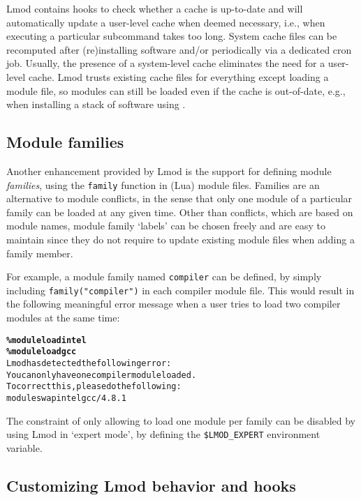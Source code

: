 Lmod contains hooks to check whether a cache is up-to-date and will automatically
update a user-level cache when deemed necessary, i.e., when executing a particular
subcommand takes too long. System cache files can be recomputed after (re)installing software and/or periodically via a dedicated cron job. Usually, the presence of a
system-level cache eliminates the need for a user-level cache.
Lmod trusts existing cache files for everything except loading a module
file, so modules can still be loaded even if the cache is out-of-date, e.g., when
installing a stack of software using \easybuild{}.


\subsection{Module families}

Another enhancement provided by Lmod is the support for defining module
\emph{families}, using the \texttt{\small family} function in (Lua) module files.
Families are an alternative to module conflicts, in the sense that only one module of
a particular family can be loaded at any given time. Other than conflicts, which
are based on module names, module family `labels' can be chosen freely and are easy
to maintain since they do not require to update existing module files when adding a
family member.

For example, a module family named \texttt{\small compiler} can be defined, by
simply including \texttt{\small family("compiler")} in each compiler module file.
This would result in the following meaningful error message when a user tries to
load two compiler modules at the same time:

{\small
\begin{alltt}
  \textbf{\% module load intel}
  \textbf{\% module load gcc}
  Lmod has detected the following error:
  You can only have one compiler module loaded.
  To correct this, please do the following:
      module swap intel gcc/4.8.1\
\end{alltt}}
\noindent
The constraint of only allowing to load one module per family can be
disabled by using Lmod in `expert mode', by defining the
\texttt{\small \$LMOD\_EXPERT} environment variable.

\subsection{Customizing Lmod behavior and hooks}

